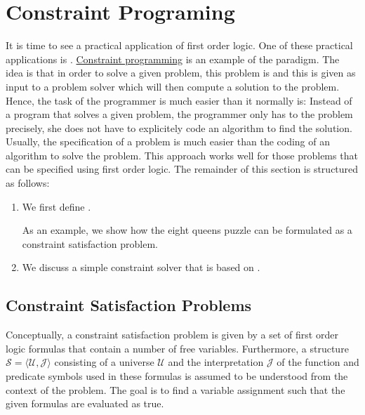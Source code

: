 \section{Constraint Programing}
It is time to see a practical application of first order logic.  One of these practical applications is .  
\href{https://en.wikipedia.org/wiki/Constraint_programming}{Constraint programming} is an example of the
 paradigm.  The idea is that 
in order to solve a given problem, this problem is  and this  is
given as input to a problem solver which will then compute a solution to the problem.  Hence, the task of the
programmer is much easier than it normally is: Instead of  a program that solves a given problem,
the programmer only has to  the problem precisely, she does not have to explicitely code an algorithm to find the
solution.  Usually, the specification of a problem is much easier than the coding of an algorithm to solve the problem.  This approach works well for those problems
that can be specified using first order logic.  The remainder of this section is structured as follows:
\begin{enumerate}
\item We first define .

      As an example, we show how the eight queens puzzle can be formulated as a constraint satisfaction
      problem.  
\item We discuss a simple constraint solver that is based on .
\end{enumerate}

\subsection{Constraint Satisfaction Problems}
Conceptually, a constraint satisfaction problem is given by a set of first order logic formulas that contain a
number of free variables.  Furthermore, a structure $\mathcal{S} = \langle \mathcal{U}, \mathcal{J}\rangle $
consisting of a universe $\mathcal{U}$ and the interpretation $\mathcal{J}$ of the function and predicate 
symbols used in these formulas is assumed to be understood from the context of the problem.  The goal is 
to find a variable assignment such that the given formulas are evaluated as true.

